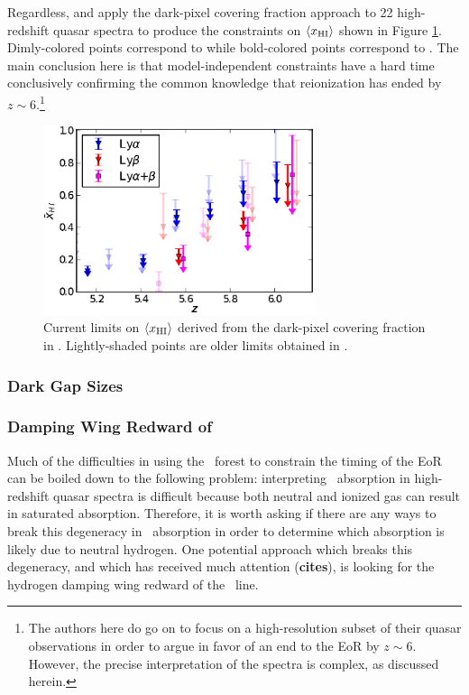 Regardless, \cite{McGreer:2011dm} and \cite{McGreer:2014qwa} apply the dark-pixel covering fraction approach to 22 high-redshift quasar spectra to produce the constraints on $\langle x_{\text{HI}}\rangle$ shown in Figure \ref{fig:McGreer}. Dimly-colored points correspond to \cite{McGreer:2011dm} while bold-colored points correspond to \cite{McGreer:2014qwa}. The main conclusion here is that model-independent constraints have a hard time conclusively confirming the common knowledge that reionization has ended by $z \sim 6$.\footnote{The authors here do go on to focus on a high-resolution subset of their quasar observations in order to argue in favor of an end to the EoR by $z \sim 6$. However, the precise interpretation of the spectra is complex, as discussed herein.} 

\begin{figure}[h]
  \centering
  \includegraphics[width=8cm]{xhi_newdata.eps}
  \caption{Current limits on $\langle x_{\text{HI}}\rangle$ derived from the dark-pixel covering fraction in \cite{McGreer:2014qwa}. Lightly-shaded points are older limits obtained in \cite{McGreer:2011dm}.}
  \label{fig:McGreer}
\end{figure}


\subsubsection{Dark Gap Sizes}
\subsubsection{Damping Wing Redward of \lya}

Much of the difficulties in using the \lya\ forest to constrain the timing of the EoR can be boiled down to the following problem: interpreting \lya\ absorption in high-redshift quasar spectra is difficult because both neutral and ionized gas can result in saturated absorption. Therefore, it is worth asking if there are any ways to break this degeneracy in \lya\ absorption in order to determine which absorption is likely due to neutral hydrogen. One potential approach which breaks this degeneracy, and which has received much attention ({\bf cites}), is looking for the hydrogen damping wing redward of the \lya\ line. 


